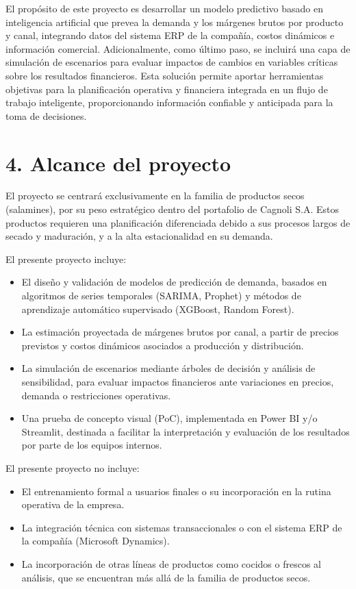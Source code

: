 \documentclass[
11pt, %
]{charter}
\begin{document}
El propósito de este proyecto es desarrollar un modelo predictivo basado en inteligencia artificial que prevea la demanda y los márgenes brutos por producto y canal, integrando datos del sistema ERP de la compañía, costos dinámicos e información comercial. Adicionalmente, como último paso, se incluirá una capa de simulación de escenarios para evaluar impactos de cambios en variables críticas sobre los resultados financieros. Esta solución permite aportar herramientas objetivas para la planificación operativa y financiera integrada en un flujo de trabajo inteligente, proporcionando información confiable y anticipada para la toma de decisiones.


\section{4. Alcance del proyecto}
\label{sec:alcance}

El proyecto se centrará exclusivamente en la familia de productos secos (salamines), por su peso estratégico dentro del portafolio de Cagnoli S.A. Estos productos requieren una planificación diferenciada debido a sus procesos largos de secado y maduración, y a la alta estacionalidad en su demanda.


El presente proyecto incluye:
\begin{itemize}
	\item El diseño y validación de modelos de predicción de demanda, basados en algoritmos de series temporales (SARIMA, Prophet) y métodos de aprendizaje automático supervisado (XGBoost, Random Forest).
	\item La estimación proyectada de márgenes brutos por canal, a partir de precios previstos y costos dinámicos asociados a producción y distribución.
	\item La simulación de escenarios mediante árboles de decisión y análisis de sensibilidad, para evaluar impactos financieros ante variaciones en precios, demanda o restricciones operativas.
	\item Una prueba de concepto visual (PoC), implementada en Power BI y/o Streamlit, destinada a facilitar la interpretación y evaluación de los resultados por parte de los equipos internos.

\end{itemize}
\pagebreak

El presente proyecto no incluye:
\begin{itemize}
	\item El entrenamiento formal a usuarios finales o su incorporación en la rutina operativa de la empresa.
	\item La integración técnica con sistemas transaccionales o con el sistema ERP de la compañía (Microsoft Dynamics).
	\item La incorporación de otras líneas de productos como cocidos o frescos al análisis, que se encuentran más allá de la familia de productos secos.

\end{itemize}
\end{document}
